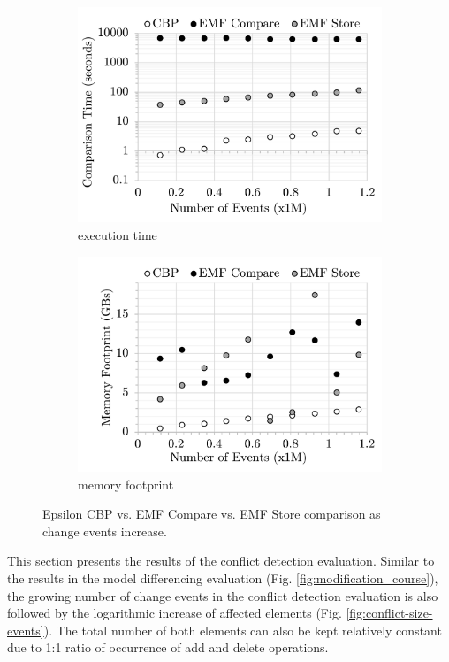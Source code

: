 \begin{figure}[ht]
\begin{subfigure}[t]{0.245\linewidth}
        \includegraphics[width=\linewidth]{conflict-time-events}
        \caption{execution time}
        \label{fig:conflict-time-events}
    \end{subfigure}
    \hfill
    \begin{subfigure}[t]{0.245\linewidth}
        \includegraphics[width=\linewidth]{conflict-memory-events}
        \caption{memory footprint}
        \label{fig:conflict-memory-events}
    \end{subfigure}
    \caption{Epsilon CBP vs. EMF Compare vs. EMF Store comparison as change events increase.}
    \label{fig:conflict_events}
\end{figure}

This section presents the results of the conflict detection evaluation. Similar to the results in the model differencing evaluation (Fig. \ref{fig:modification_course}), the growing number of change events in the conflict detection evaluation is also followed by the logarithmic increase of affected elements (Fig. \ref{fig:conflict-size-events}). The total number of both elements can also be kept relatively constant due to 1:1 ratio of occurrence of \textsf{add} and \textsf{delete} operations. 

